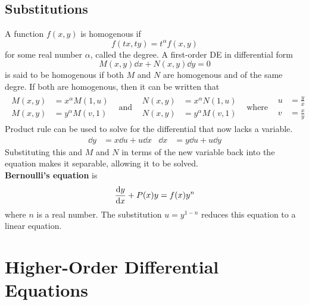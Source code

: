 \documentclass[12pt, A4]{article}
\begin{document}
		\subsection{Substitutions}
			A function \(f(x, y)\) is homogenous if
				\[f(tx, ty) = t^\alpha f(x, y)\]
				for some real number \(\alpha\), called the degree. A first-order DE in differential form
				\[M(x, y)\dd{x} + N(x, y)\dd{y} = 0\]
				is said to be homogenous if both \(M\) and \(N\) are homogenous and of the same degre. If both are homogenous, then it can be written that
				\[\begin{array}{ccccc}
					\begin{aligned}
						M(x, y) &= x^\alpha M(1, u) \\
						M(x, y) &= y^\alpha M(v, 1)
					\end{aligned} & \text{and} &
					\begin{aligned}
						N(x, y) &= x^\alpha N(1, u) \\
						N(x, y) &= y^\alpha M(v, 1)
					\end{aligned} & \text{where} &
					\begin{aligned}
						u &= \frac{y}{x} \\
						v &= \frac{x}{y}	
					\end{aligned}
				\end{array}\]
				Product rule can be used to solve for the differential that now lacks a variable. \\
				\begin{align*}
					\dd{y} &= x\dd{u} + u\dd{x} &
						\dd{x} &= y\dd{u} + u\dd{y}	
				\end{align*}
				Substituting this and \(M\) and \(N\) in terms of the new variable back into the equation makes it separable, allowing it to be solved. \\
			\textbf{Bernoulli's equation} is 
				\[\dv{y}{x} + P(x)y = f(x)y^n\]
				where \(n\) is a real number. The substitution \(u = y^{1 - n}\) reduces this equation to a linear equation.
	\setcounter{section}{3}
	\section{Higher-Order Differential Equations}
\end{document}
